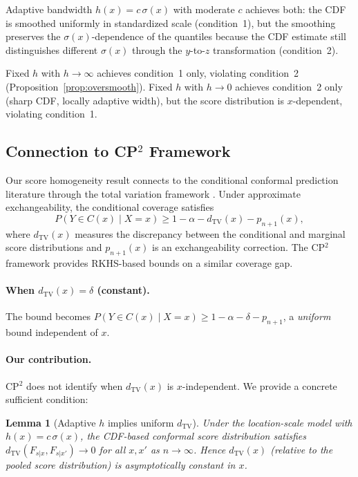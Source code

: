 \documentclass[11pt]{article}
\newtheorem{lemma}[theorem]{Lemma}
\theoremstyle{remark}
\begin{document}
Adaptive bandwidth $h(x) = c\,\sigma(x)$ with moderate $c$ achieves
both: the CDF is smoothed uniformly in standardized scale (condition~1),
but the smoothing preserves the $\sigma(x)$-dependence of the
quantiles because the CDF estimate still distinguishes different
$\sigma(x)$ through the $y$-to-$z$ transformation (condition~2).

Fixed $h$ with $h \to \infty$ achieves condition~1 only, violating
condition~2 (Proposition~\ref{prop:oversmooth}).
Fixed $h$ with $h \to 0$ achieves condition~2 only (sharp CDF,
locally adaptive width), but the score distribution is
$x$-dependent, violating condition~1.

\subsection{Connection to CP$^2$ Framework}
\label{sec:cp2}

Our score homogeneity result connects to the conditional conformal
prediction literature through the total variation framework
\cite{Barber2023}. Under approximate exchangeability, the conditional
coverage satisfies
\begin{equation}
\label{eq:cp2-bound}
  P(Y \in C(x) \mid X = x) \ge 1 - \alpha
  - d_{\mathrm{TV}}(x) - p_{n+1}(x),
\end{equation}
where $d_{\mathrm{TV}}(x)$ measures the discrepancy between the
conditional and marginal score distributions and $p_{n+1}(x)$ is an
exchangeability correction. The CP$^2$ framework \cite{CP2} provides
RKHS-based bounds on a similar coverage gap.

\paragraph{When $d_{\mathrm{TV}}(x) = \delta$ (constant).}
The bound becomes $P(Y \in C(x) \mid X=x) \ge 1 - \alpha - \delta
- p_{n+1}$, a \emph{uniform} bound independent of $x$.

\paragraph{Our contribution.}
CP$^2$ does not identify when $d_{\mathrm{TV}}(x)$ is $x$-independent.
We provide a concrete sufficient condition:

\begin{lemma}[Adaptive $h$ implies uniform $d_{\mathrm{TV}}$]
\label{lem:uniform-dtv}
Under the location-scale model with
$h(x) = c\,\sigma(x)$, the CDF-based conformal score distribution
satisfies $d_{\mathrm{TV}}(F_{s|x}, F_{s|x'}) \to 0$ for all
$x, x'$ as $n \to \infty$. Hence $d_{\mathrm{TV}}(x)$ (relative to
the pooled score distribution) is asymptotically constant in $x$.
\end{lemma}
\end{document}
